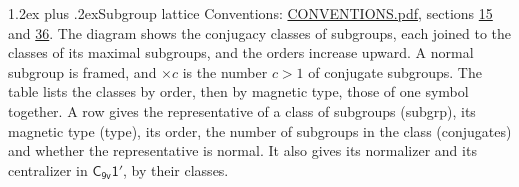 \documentclass[10pt,a4paper]{article}
\makeatletter
\renewcommand\section{\@startsection{section}{1}{\z@}{-3ex plus -1ex minus -.2ex}%
  {1.2ex plus .2ex}{\normalfont\large\sffamily\bfseries\color{parttitle}}}
\numberwithin{equation}{section}
\newcommand{\grp}[1]{\mathsf{#1}}
\makeatother
\begin{document}
\section{Subgroup lattice}\label{s:subgroups}
Conventions: \href{../../CONVENTIONS.pdf}{CONVENTIONS.pdf}, sections \href{../../../rotation/CONVENTIONS.pdf\#conv.15}{15} and \href{../../CONVENTIONS.pdf\#conv.36}{36}.
The diagram shows the conjugacy classes of subgroups, each joined to the classes of its maximal subgroups, and the orders increase upward. \label{n:index.conjugates.c}\label{n:mark.conjugates}A normal subgroup is framed, and ${\times}c$ is the number $c > 1$ of conjugate subgroups. The table lists the classes by order, then by magnetic type, those of one symbol together. \label{n:head.subgroup}\label{n:head.magnetic.type}\label{n:head.order}\label{n:head.conjugates}\label{n:head.normal}A row gives the representative of a class of subgroups (subgrp), its magnetic type (type), its order, the number of subgroups in the class (conjugates) and whether the representative is normal. \label{n:head.normalizer}\label{n:head.centralizer}It also gives its normalizer and its centralizer in $\grp{C_{9v}1'}$, by their classes. 
\end{document}
